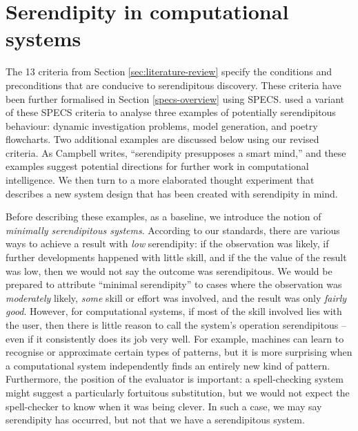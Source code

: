 \section{Serendipity in computational systems} \label{sec:computational-serendipity}

The 13 criteria from Section \ref{sec:literature-review} specify the
conditions and preconditions that are conducive to serendipitous
discovery.  These criteria have been further formalised
in Section \ref{specs-overview} using SPECS.
 used a variant of these SPECS criteria to
analyse three examples of potentially serendipitous behaviour: dynamic
investigation problems, model generation, and poetry flowcharts.  Two
additional examples are discussed below using our revised criteria.
As Campbell \citeyear{campbell2005serendipity} writes, ``serendipity
presupposes a smart mind,'' and these examples suggest potential
directions for further work in computational intelligence.  We then
turn to a more elaborated thought experiment that describes a new
system design that has been created with serendipity in mind.

Before describing these examples, as a baseline, we introduce the
notion of \emph{minimally serendipitous systems}. According to our
standards, there are various ways to achieve a result with \emph{low}
serendipity: if the observation was likely, if further developments
happened with little skill, and if the the value of the result was
low, then we would not say the outcome was serendipitous.  We would be
prepared to attribute ``minimal serendipity'' to cases where the
observation was \emph{moderately} likely, \emph{some} skill or effort
was involved, and the result was only \emph{fairly good}.  However,
for computational systems, if most of the skill involved lies with the
user, then there is little reason to call the system's operation
serendipitous -- even if it consistently does its job very well.  For
example, machines can learn to recognise or approximate certain types
of patterns, but it is more surprising when a computational system
independently finds an entirely new kind of pattern.  Furthermore, the
position of the evaluator is important: a spell-checking system might
suggest a particularly fortuitous substitution, but we would not
expect the spell-checker to know when it was being clever.  In such a
case, we may say serendipity has occurred, but not that we have a
serendipitous system.

